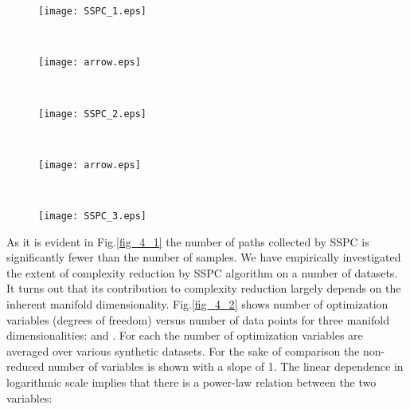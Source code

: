 \documentclass[10pt,journal,cspaper,compsoc]{IEEEtran}
\let\MYoriglatexcaption\caption
\renewcommand{\caption}[2][\relax]{\MYoriglatexcaption[#2]{#2}}
\begin{document}
\begin{figure*}[t]
        \begin{subfigure}[b]{0.29\textwidth}
                \texttt{[image: SSPC\_1.eps]}
                \caption{}
        \end{subfigure}~
        \begin{subfigure}[b]{0.05\textwidth}
		        \texttt{[image: arrow.eps]}	
        \end{subfigure}~
        \begin{subfigure}[b]{0.29\textwidth}
                \texttt{[image: SSPC\_2.eps]}
                \caption{}
        \end{subfigure}~
        \begin{subfigure}[b]{0.05\textwidth}
		        \texttt{[image: arrow.eps]}
        \end{subfigure}~
        \begin{subfigure}[b]{0.29\textwidth}
                \texttt{[image: SSPC\_3.eps]}
                \caption{}
        \end{subfigure}
        \vspace{1mm}
        \caption{{\small SSPC sample run on a Swiss-Roll dataset consisting of  data points. The number of paths obtained by the method in this example is . (a) The high-dimensional data in . (b) Result of the SSPC in . (c) The results shown for the unfolded manifold.}}\label{fig_4_1}
\end{figure*}

As it is evident in Fig.\ref{fig_4_1} the number of paths collected by SSPC is significantly fewer than the number of samples. We have empirically investigated the extent of complexity reduction by SSPC algorithm on a number of datasets. It turns out that its contribution to complexity reduction largely depends on the inherent manifold dimensionality. Fig.\ref{fig_4_2} shows number of optimization variables (degrees of freedom) versus number of data points for three manifold dimensionalities:  and . For each  the number of optimization variables are averaged over various synthetic datasets. For the sake of comparison the non-reduced number of variables is shown with a slope of 1. The linear dependence in logarithmic scale implies that there is a power-law relation between the two variables:
\end{document}
